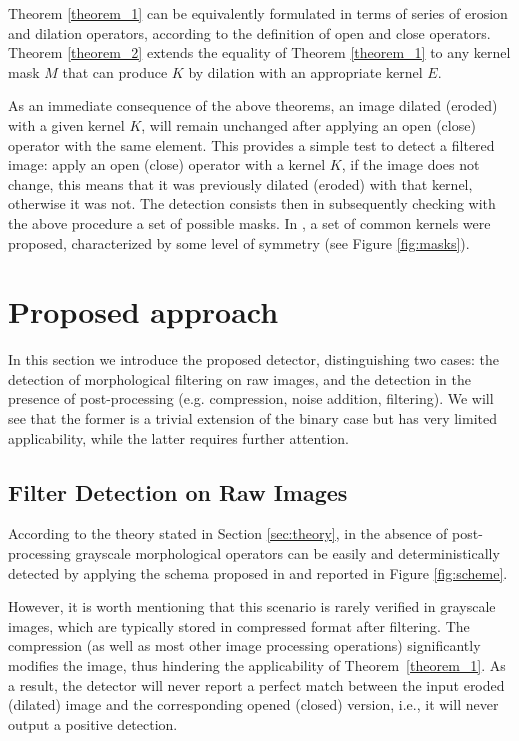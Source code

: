 \documentclass{ieeeaccess}
\begin{document}
Theorem \ref{theorem_1} can be equivalently formulated in terms of series of erosion and dilation operators, according to the definition of open and close operators. Theorem \ref{theorem_2} extends the equality of Theorem \ref{theorem_1} to any kernel mask $M$ that can produce $K$ by dilation with an appropriate kernel $E$.

As an immediate consequence of the above theorems, an image dilated (eroded) with a given kernel $K$, will remain unchanged after applying an open (close) operator with the same element. This provides a simple test to detect a filtered image: apply an open (close) operator with a kernel $K$, if the image does not change, this means that it was previously dilated (eroded) with that kernel, otherwise it was not. The detection consists then in subsequently checking with the above procedure a set of possible masks. In \cite{de2017detecting}, a set of common kernels were proposed, characterized by some level of symmetry (see Figure \ref{fig:masks}).



\section{Proposed approach}
\label{sec:method}

In this section we introduce the proposed detector, distinguishing two cases: the detection of morphological filtering on raw images, and the detection in the presence of post-processing (e.g. compression, noise addition, filtering). We will see that the former is a trivial extension of the binary case but has very limited applicability, while the latter requires further attention.

\subsection{Filter Detection on Raw Images}

According to the theory stated in Section \ref{sec:theory}, in the absence of post-processing grayscale morphological operators can be easily and deterministically detected by applying the schema proposed in 
\cite{de2017detecting} and reported in Figure \ref{fig:scheme}.

However, it is worth mentioning that this scenario is rarely verified in grayscale images, which are typically stored in compressed format after filtering. The compression (as well as most other image processing operations) significantly modifies the image, thus hindering the applicability of Theorem~\ref{theorem_1}. As a result, the detector will never report a perfect match between the input eroded (dilated) image and the corresponding opened (closed) version, i.e., it will never output a positive detection.
\end{document}
